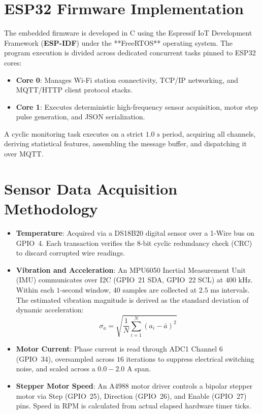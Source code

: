\documentclass[12pt,a4paper]{report}
\begin{document}
\section{ESP32 Firmware Implementation}
The embedded firmware is developed in C using the Espressif IoT Development Framework (\textbf{ESP-IDF}) under the **FreeRTOS** operating system. The program execution is divided across dedicated concurrent tasks pinned to ESP32 cores:
\begin{itemize}
    \item \textbf{Core 0}: Manages Wi-Fi station connectivity, TCP/IP networking, and MQTT/HTTP client protocol stacks.
    \item \textbf{Core 1}: Executes deterministic high-frequency sensor acquisition, motor step pulse generation, and JSON serialization.
\end{itemize}
A cyclic monitoring task executes on a strict $1.0\text{ s}$ period, acquiring all channels, deriving statistical features, assembling the message buffer, and dispatching it over MQTT.

\section{Sensor Data Acquisition Methodology}
\begin{itemize}
    \item \textbf{Temperature}: Acquired via a DS18B20 digital sensor over a 1-Wire bus on GPIO~4. Each transaction verifies the 8-bit cyclic redundancy check (CRC) to discard corrupted wire readings.
    \item \textbf{Vibration and Acceleration}: An MPU6050 Inertial Measurement Unit (IMU) communicates over I2C (GPIO~21 SDA, GPIO~22 SCL) at $400\text{ kHz}$. Within each $1\text{-second}$ window, $40$ samples are collected at $2.5\text{ ms}$ intervals. The estimated vibration magnitude is derived as the standard deviation of dynamic acceleration:
    \begin{equation}
        \sigma_a = \sqrt{\frac{1}{N} \sum_{i=1}^{N} (a_i - \bar{a})^2}
    \end{equation}
    \item \textbf{Motor Current}: Phase current is read through ADC1 Channel 6 (GPIO~34), oversampled across $16$ iterations to suppress electrical switching noise, and scaled across a $0.0 - 2.0\text{ A}$ span.
    \item \textbf{Stepper Motor Speed}: An A4988 motor driver controls a bipolar stepper motor via Step (GPIO~25), Direction (GPIO~26), and Enable (GPIO~27) pins. Speed in RPM is calculated from actual elapsed hardware timer ticks.
\end{itemize}
\end{document}
